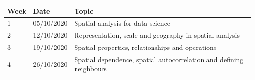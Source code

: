 \documentclass[
]{book}
\begin{document}
\begin{longtable}[]{@{}lll@{}}
\toprule
\begin{minipage}[b]{0.23\columnwidth}\raggedright
Week\strut
\end{minipage} & \begin{minipage}[b]{0.20\columnwidth}\raggedright
Date\strut
\end{minipage} & \begin{minipage}[b]{0.49\columnwidth}\raggedright
Topic\strut
\end{minipage}\tabularnewline
\midrule
\endhead
\begin{minipage}[t]{0.23\columnwidth}\raggedright
1\strut
\end{minipage} & \begin{minipage}[t]{0.20\columnwidth}\raggedright
05/10/2020\strut
\end{minipage} & \begin{minipage}[t]{0.49\columnwidth}\raggedright
Spatial analysis for data science\strut
\end{minipage}\tabularnewline
\begin{minipage}[t]{0.23\columnwidth}\raggedright
2\strut
\end{minipage} & \begin{minipage}[t]{0.20\columnwidth}\raggedright
12/10/2020\strut
\end{minipage} & \begin{minipage}[t]{0.49\columnwidth}\raggedright
Representation, scale and geography in spatial analysis\strut
\end{minipage}\tabularnewline
\begin{minipage}[t]{0.23\columnwidth}\raggedright
3\strut
\end{minipage} & \begin{minipage}[t]{0.20\columnwidth}\raggedright
19/10/2020\strut
\end{minipage} & \begin{minipage}[t]{0.49\columnwidth}\raggedright
Spatial properties, relationships and operations\strut
\end{minipage}\tabularnewline
\begin{minipage}[t]{0.23\columnwidth}\raggedright
4\strut
\end{minipage} & \begin{minipage}[t]{0.20\columnwidth}\raggedright
26/10/2020\strut
\end{minipage} & \begin{minipage}[t]{0.49\columnwidth}\raggedright
Spatial dependence, spatial autocorrelation and defining neighbours\strut

\end{minipage}
\end{longtable}
\end{document}

